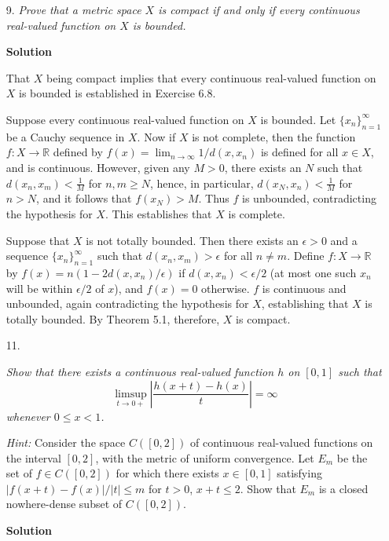 \documentclass{article}
\begin{document}
\begin{enumerate}
\begin{itemize}
\item[9.] {\em Prove that a metric space \(X\) is compact if and only if every continuous real-valued function on \(X\) is bounded.}

{\bf Solution}

That \(X\) being compact implies that every continuous real-valued function on \(X\) is bounded is established in Exercise 6.8.

Suppose every continuous real-valued function on \(X\) is bounded.  Let \(\{x_n\}_{n = 1}^{\infty}\) be a Cauchy sequence in \(X\).  Now if \(X\) is not complete, then the function \(f : X \to \mathbb{R}\) defined by \(f(x) = \lim_{n \to \infty} 1/d(x,x_n)\) is defined for all \(x \in X\), and is continuous.  However, given any \(M > 0\), there exists an \(N\) such that \(d(x_n,x_m) < \frac{1}{M}\) for \(n,m \geq N\), hence, in particular, \(d(x_N,x_n) < \frac{1}{M}\) for \(n > N\), and it follows that \(f(x_N) > M\).  Thus \(f\) is unbounded, contradicting the hypothesis for \(X\).  This establishes that \(X\) is complete.

Suppose that \(X\) is not totally bounded.  Then there exists an \(\epsilon > 0\) and a sequence \(\{x_n\}_{n = 1}^{\infty}\) such that \(d(x_n,x_m) > \epsilon\) for all \(n \neq m\).  Define \(f : X \to \mathbb{R}\) by \(f(x) = n(1 - 2d(x,x_n)/\epsilon)\) if \(d(x,x_n) < \epsilon/2\) (at most one such \(x_n\) will be within \(\epsilon/2\) of \(x\)), and \(f(x) = 0\) otherwise.  \(f\) is continuous and unbounded, again contradicting the hypothesis for \(X\), establishing that \(X\) is totally bounded.  By Theorem 5.1, therefore, \(X\) is compact.



\item[11.] {\em Show that there exists a continuous real-valued function \(h\) on \([0,1]\) such that
\[\limsup_{t \to 0+} \left| \frac{h(x + t) - h(x)}{t} \right| = \infty\]
whenever \(0 \leq x < 1\).

{\em Hint:}  Consider the space \(C([0,2])\) of continuous real-valued functions on the interval \([0,2]\), with the metric of uniform convergence.  Let \(E_m\) be the set of \(f \in C([0,2])\) for which there exists \(x \in [0,1]\) satisfying \(|f(x + t) - f(x)| / |t| \leq m\) for \(t > 0\), \(x + t \leq 2\).  Show that \(E_m\) is a closed nowhere-dense subset of \(C([0,2])\).}

{\bf Solution}



\end{itemize}


\end{enumerate}
\end{document}
